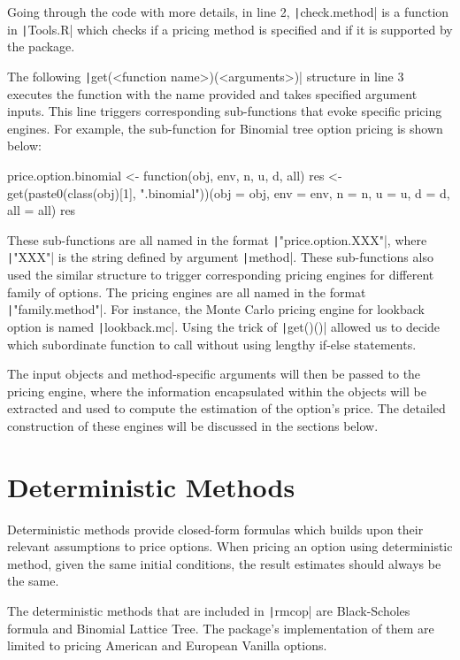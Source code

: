 Going through the code with more details, in line 2, \texttt|check.method| is a function in \texttt|Tools.R| which checks if a pricing method is specified and if it is supported by the package.

The following \texttt|get(<function name>)(<arguments>)| structure in line 3 executes the function with the name provided and takes specified argument inputs. This line triggers corresponding sub-functions that evoke specific pricing engines. For example, the sub-function for Binomial tree option pricing is shown below:

\begin{Rminted}
price.option.binomial <- function(obj, env, n, u, d, all) {
    res <- get(paste0(class(obj)[1], ".binomial"))(obj = obj, env = env, n = n, u = u, d = d, all = all)
    res
}
\end{Rminted}

These sub-functions are all named in the format \texttt|"price.option.XXX"|, where \texttt|"XXX"| is the string defined by argument \texttt|method|. These sub-functions also used the similar structure to trigger corresponding pricing engines for different family of options. The pricing engines are all named in the format \texttt|"family.method"|. For instance, the Monte Carlo pricing engine for lookback option is named \texttt|lookback.mc|. Using the trick of \texttt|get()()| allowed us to decide which subordinate function to call without using lengthy if-else statements.

The input objects and method-specific arguments will then be passed to the pricing engine, where the information encapsulated within the objects will be extracted and used to compute the estimation of the option's price. The detailed construction of these engines will be discussed in the sections below.

\section{Deterministic Methods}

Deterministic methods provide closed-form formulas which builds upon their relevant assumptions to price options. When pricing an option using deterministic method, given the same initial conditions, the result estimates should always be the same.

The deterministic methods that are included in \texttt|rmcop| are Black-Scholes formula and Binomial Lattice Tree. The package's implementation of them are limited to pricing American and European Vanilla options.

